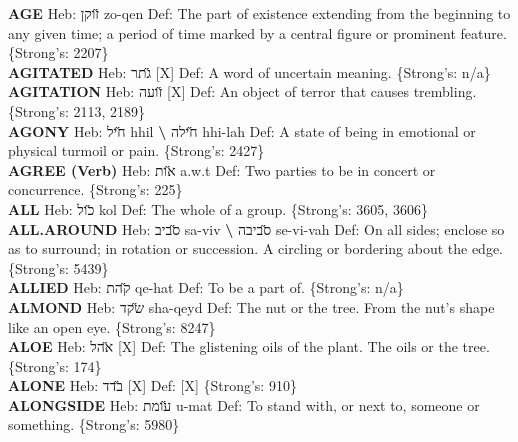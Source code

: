 {\textbf{AGE} Heb: {\large\H זוקן} zo-qen Def: The part of existence extending from the beginning to any given time; a period of time marked by a central figure or prominent feature. \{Strong's: 2207\}\hfill{}\\

\textbf{AGITATED} Heb: {\large\H גתר} {[}X{]} Def: A word of uncertain meaning. \{Strong's: n/a\}\hfill{}\\

\textbf{AGITATION} Heb: {\large\H זועה} {[}X{]} Def: An object of terror that causes trembling. \{Strong's: 2113, 2189\}\hfill{}\\

\textbf{AGONY} Heb: {\large\H חיל} hhil \textbf{\textbackslash{}} {\large\H חילה} hhi-lah Def: A state of being in emotional or physical turmoil or pain. \{Strong's: 2427\}\hfill{}\\

\textbf{AGREE (Verb)} Heb: {\large\H אות} a.w.t Def: Two parties to be in concert or concurrence. \{Strong's: 225\}\hfill{}\\

\textbf{ALL} Heb: {\large\H כול} kol Def: The whole of a group. \{Strong's: 3605, 3606\}\hfill{}\\

\textbf{ALL.AROUND} Heb: {\large\H סביב} sa-viv \textbf{\textbackslash{}} {\large\H סביבה} se-vi-vah Def: On all sides; enclose so as to surround; in rotation or succession. A circling or bordering about the edge. \{Strong's: 5439\}\hfill{}\\

\textbf{ALLIED} Heb: {\large\H קהת} qe-hat Def: To be a part of. \{Strong's: n/a\}\hfill{}\\

\textbf{ALMOND} Heb: {\large\H שקד} sha-qeyd Def: The nut or the tree. From the nut’s shape like an open eye. \{Strong's: 8247\}\hfill{}\\

\textbf{ALOE} Heb: {\large\H אהל} {[}X{]} Def: The glistening oils of the plant. The oils or the tree. \{Strong's: 174\}\hfill{}\\

\textbf{ALONE} Heb: {\large\H בדד} {[}X{]} Def: {[}X{]} \{Strong's: 910\}\hfill{}\\

\textbf{ALONGSIDE} Heb: {\large\H עומת} u-mat Def: To stand with, or next to, someone or something. \{Strong's: 5980\}\hfill{}\\

}
